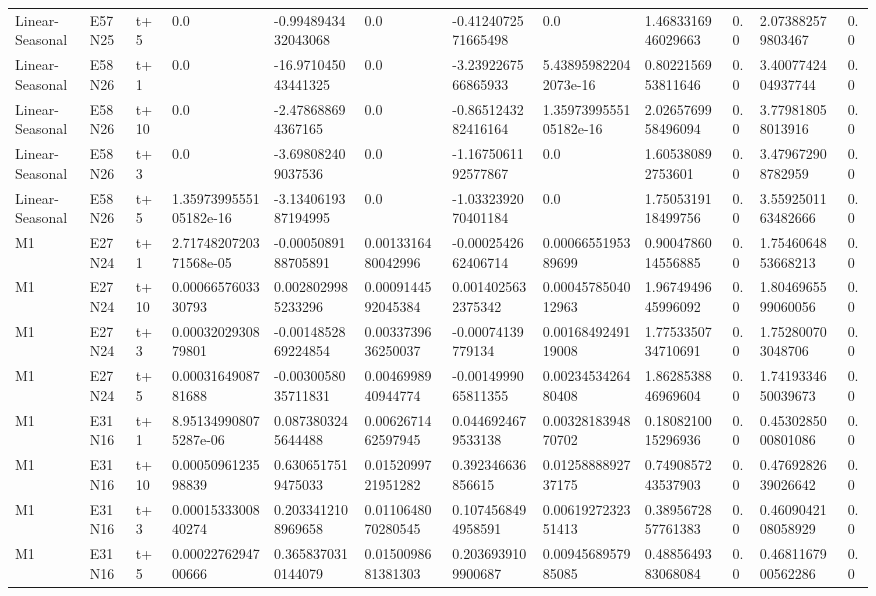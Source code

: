 \begin{landscape}
\begin{longtable}{llllllllllll}
Linear-Seasonal & E57N25 & t+5 & 0.0 & -0.9948943432043068 & 0.0 & -0.4124072571665498 & 0.0 & 1.4683316946029663 & 0.0 & 2.073882579803467 & 0.0 \\
Linear-Seasonal & E58N26 & t+1 & 0.0 & -16.971045043441325 & 0.0 & -3.2392267566865933 & 5.438959822042073e-16 & 0.8022156953811646 & 0.0 & 3.4007742404937744 & 0.0 \\
Linear-Seasonal & E58N26 & t+10 & 0.0 & -2.478688694367165 & 0.0 & -0.8651243282416164 & 1.3597399555105182e-16 & 2.0265769958496094 & 0.0 & 3.779818058013916 & 0.0 \\
Linear-Seasonal & E58N26 & t+3 & 0.0 & -3.698082409037536 & 0.0 & -1.1675061192577867 & 0.0 & 1.605380892753601 & 0.0 & 3.479672908782959 & 0.0 \\
Linear-Seasonal & E58N26 & t+5 & 1.3597399555105182e-16 & -3.1340619387194995 & 0.0 & -1.0332392070401184 & 0.0 & 1.7505319118499756 & 0.0 & 3.5592501163482666 & 0.0 \\
M1 & E27N24 & t+1 & 2.7174820720371568e-05 & -0.0005089188705891 & 0.0013316480042996 & -0.0002542662406714 & 0.0006655195389699 & 0.9004786014556885 & 0.0 & 1.7546064853668213 & 0.0 \\
M1 & E27N24 & t+10 & 0.0006657603330793 & 0.0028029985233296 & 0.0009144592045384 & 0.0014025632375342 & 0.0004578504012963 & 1.9674949645996092 & 0.0 & 1.8046965599060056 & 0.0 \\
M1 & E27N24 & t+3 & 0.0003202930879801 & -0.0014852869224854 & 0.0033739636250037 & -0.00074139779134 & 0.0016849249119008 & 1.7753350734710691 & 0.0 & 1.752800703048706 & 0.0 \\
M1 & E27N24 & t+5 & 0.0003164908781688 & -0.0030058035711831 & 0.0046998940944774 & -0.0014999065811355 & 0.0023453426480408 & 1.8628538846969604 & 0.0 & 1.7419334650039673 & 0.0 \\
M1 & E31N16 & t+1 & 8.951349908075287e-06 & 0.0873803245644488 & 0.0062671462597945 & 0.0446924679533138 & 0.0032818394870702 & 0.1808210015296936 & 0.0 & 0.4530285000801086 & 0.0 \\
M1 & E31N16 & t+10 & 0.0005096123598839 & 0.6306517519475033 & 0.0152099721951282 & 0.392346636856615 & 0.0125888892737175 & 0.7490857243537903 & 0.0 & 0.4769282639026642 & 0.0 \\
M1 & E31N16 & t+3 & 0.0001533300840274 & 0.2033412108969658 & 0.0110648070280545 & 0.1074568494958591 & 0.0061927232351413 & 0.3895672857761383 & 0.0 & 0.4609042108058929 & 0.0 \\
M1 & E31N16 & t+5 & 0.0002276294700666 & 0.3658370310144079 & 0.0150098681381303 & 0.2036939109900687 & 0.0094568957985085 & 0.4885649383068084 & 0.0 & 0.4681167900562286 & 0.0 \\

\end{longtable}
\end{landscape}
